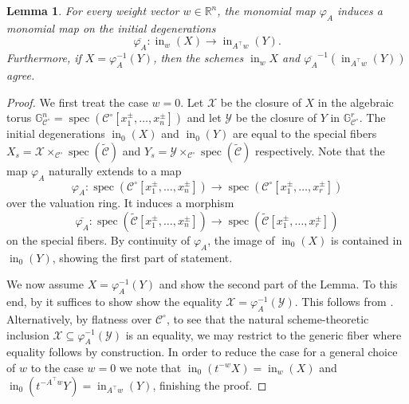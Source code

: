 \documentclass{article}
\newtheorem{lemma}[theorem]{Lemma}
\theoremstyle{definition}
\DeclareMathOperator{\initial}{in}
\newcommand{\CC}{\mathcal{C}}
\newcommand{\inw}{\operatorname{in}_w}
\begin{document}
\begin{lemma}
\label{lemma: induced map of initial degs}
For every weight vector $w \in \mathbb{R}^n$,
the monomial map $\varphi_A$ induces a monomial map on the initial degenerations
\[
\overline{\varphi_A}\colon \inw (X) \longrightarrow \initial_{A^{\top}w} (Y).
\]
Furthermore, if $X = \varphi_A^{-1}(Y)$, then
the schemes $\inw X $ and 
$\overline{\varphi_A}^{-1}(\initial_{A^\top w} (Y))$ agree.
\end{lemma}
\begin{proof}
We first treat the case $w = 0$.
Let $\mathcal{X}$ be the closure of $X$ in the algebraic torus $\mathbb{G}^n_{\CC^\circ} = \operatorname{spec}(\CC^\circ[x_1^\pm, \dots, x_n^\pm])$ and 
let $\mathcal{Y}$ be the closure of $Y$ in $\mathbb{G}^r_{\CC^\circ}$.
The initial degenerations $\initial_0(X)$ and $\initial_0(Y)$ are equal to the special fibers $X_s = \mathcal{X} \times_{\CC^\circ} \operatorname{spec}(\widetilde{\CC})$ and $Y_s = \mathcal{Y} \times_{\CC^\circ} \operatorname{spec}(\widetilde{\CC})$ respectively.
Note that the map $\varphi_A$ naturally extends to a map
\[\varphi_A\colon \operatorname{spec}(\CC^\circ[x_1^\pm, \dots, x_n^\pm]) \longrightarrow \operatorname{spec}(\CC^\circ[x_1^\pm, \dots, x_r^\pm])\] over the valuation ring.
It induces a morphism
\[\overline{\varphi_A}\colon \operatorname{spec}(\widetilde{\CC}[x_1^\pm, \dots, x_n^\pm]) \longrightarrow \operatorname{spec}(\widetilde{\CC}[x_1^\pm, \dots, x_r^\pm])\] on the special fibers.
By continuity of $\varphi_A$, the image of $\initial_0(X)$ is contained in $\initial_0(Y)$, showing the first part of statement.

We now assume $X = \varphi_A^{-1}(Y)$ and show the second part of the Lemma.
To this end, by  it suffices to show show the equality $\mathcal{X} = \varphi_A^{-1}(\mathcal{Y})$.
This follows from \cite[\href{https://stacks.math.columbia.edu/tag/0CMK}{Lemma 101.38.5}]{stacks-project}.
Alternatively, by flatness over $\CC^\circ$, to see that the natural scheme-theoretic inclusion
$\mathcal{X} \subseteq \varphi_A^{-1}(\mathcal{Y})$ is an equality, 
we may restrict to the generic fiber where equality follows by construction.
In order to reduce the case for a general choice of $w$ to the case $w = 0$ we note that  $\initial_0(t^{-w}X) =  \inw(X)$ and 
$\initial_0(t^{-A^\top w}Y) = \initial_{A^\top w} (Y)$, finishing the proof.
\end{proof}
\end{document}
